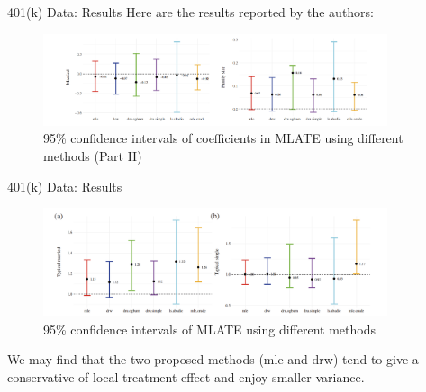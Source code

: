 \documentclass[aspectratio=169,xcolor=dvipsnames]{beamer}
\begin{document}
\begin{frame}{401(k) Data: Results}
Here are the results reported by the authors:
\begin{figure}
\includegraphics[width=0.9\textwidth]{figure/401k2.png}
\caption{95\% confidence intervals of coefficients in MLATE using different methods (Part II)}
\end{figure}
\end{frame}

\begin{frame}{401(k) Data: Results}
\begin{figure}
\includegraphics[width=0.9\textwidth]{figure/401k3.png}
\caption{95\% confidence intervals of MLATE using different methods}
\end{figure}
We may find that the two proposed methods (mle and drw) tend to give a conservative of local treatment effect and enjoy smaller variance.
\end{frame}
\end{document}
